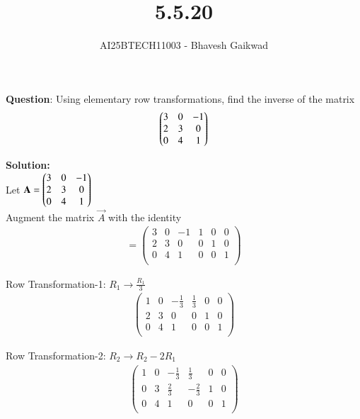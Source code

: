 \documentclass[journal]{IEEEtran}
\begin{document}

\vspace{3cm}

\title{5.5.20}
\author{AI25BTECH11003 - Bhavesh Gaikwad}
{\let\newpage\relax\maketitle}

\renewcommand{\thefigure}{\theenumi}
\renewcommand{\thetable}{\theenumi}
\setlength{\intextsep}{10pt} 


\renewcommand{\thetable}{\theenumi}


\textbf{Question}: 
Using elementary row transformations, find the inverse of the matrix
$$\begin{pmatrix}3 & 0 & -1 \\ 2 & 3 & 0 \\ 0 & 4 & 1\end{pmatrix}$$

\textbf{Solution:}\\
Let $\mathbf{A} = \begin{pmatrix}3 & 0 & -1 \\ 2 & 3 & 0 \\ 0 & 4 & 1\end{pmatrix}$\\

Augment the matrix $\vec{A}$ with the identity
\begin{align}
[\vec{A} \, | \, \vec{I}] =
\left(
\begin{array}{ccc|ccc}
3 & 0 & -1 & 1 & 0 & 0 \\
2 & 3 & 0 & 0 & 1 & 0 \\
0 & 4 & 1 & 0 & 0 & 1 \\
\end{array}
\right)
\end{align}

Row Transformation-1: $R_1 \rightarrow \frac{R_1}{3}$
\begin{align}
\left(
\begin{array}{ccc|ccc}
1 & 0 & -\frac{1}{3} & \frac{1}{3} & 0 & 0 \\
2 & 3 & 0 & 0 & 1 & 0 \\
0 & 4 & 1 & 0 & 0 & 1 \\
\end{array}
\right)
\end{align}

Row Transformation-2: $R_2 \rightarrow R_2 - 2R_1$
\begin{align}
\left(
\begin{array}{ccc|ccc}
1 & 0 & -\frac{1}{3} & \frac{1}{3} & 0 & 0 \\
0 & 3 & \frac{2}{3} & -\frac{2}{3} & 1 & 0 \\
0 & 4 & 1 & 0 & 0 & 1 \\
\end{array}
\right)
\end{align}
\end{document}
